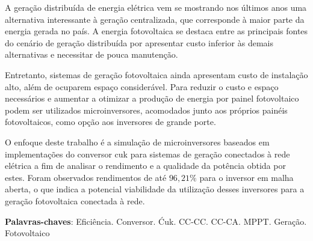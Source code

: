 \documentclass[
	12pt,				%
	openany,
	onseside,
	a4paper,			%
	english,			%
	french,				%
	spanish,			%
	brazil,				%
	]{abntex2}
\begin{document}


	\setlength{\absparsep}{18pt} %
	\AtBeginShipoutNext{\AtBeginShipoutNext{\AtBeginShipoutDiscard}}
	\begin{resumo}
	
		A geração distribuída de energia elétrica vem se mostrando nos últimos anos uma alternativa interessante à geração centralizada, que corresponde à maior parte da energia gerada no país. A energia fotovoltaica se destaca entre as principais fontes do cenário de geração distribuída por apresentar custo inferior às demais alternativas e necessitar de pouca manutenção.

		Entretanto, sistemas de geração fotovoltaica ainda apresentam custo de instalação alto, além de ocuparem espaço considerável. Para reduzir o custo e espaço necessários e aumentar a otimizar a produção de energia por painel fotovoltaico podem ser utilizados microinversores, acomodados junto aos próprios painéis fotovoltaicos, como opção aos inversores de grande porte. 

		O enfoque deste trabalho é a simulação de microinversores baseados em implementações do conversor cuk para sistemas de geração conectados à rede elétrica a fim de analisar o rendimento e a qualidade da potência obtida por estes. Foram observados rendimentos de até $96,21\%$  para o inversor em malha aberta, o que indica a potencial viabilidade da utilização desses inversores para a geração fotovoltaica conectada à rede.

	\vspace{\onelineskip}
	\noindent
	\textbf{Palavras-chaves}: Eficiência. Conversor. Ćuk. CC-CC. CC-CA. MPPT. Geração. Fotovoltaico 
	\end{resumo}
\end{document}
